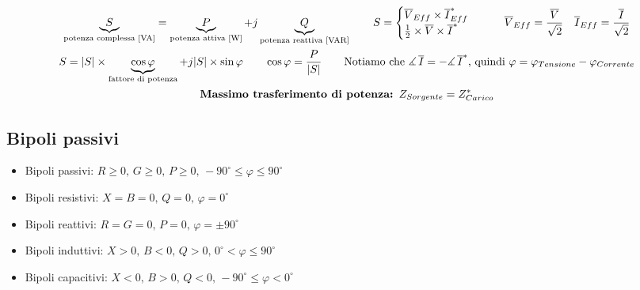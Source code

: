 \documentclass[10pt]{article}
\renewcommand{\deg}{^{\circ}}
\begin{document}
        \begin{gather*}
            \underbrace{S}_{\text{potenza complessa [VA]}} = \underbrace{P}_{\text{potenza attiva [W]}} + j \underbrace{Q}_{\text{potenza reattiva [VAR]}} \qquad
                S =
                    \begin{cases}
                        \overline{V}_{Eff} \times \overline{I}^*_{Eff}\\
                        \frac{1}{2} \times \overline{V} \times \overline{I}^*
                    \end{cases}
                \qquad \overline{V}_{Eff} = \frac{\overline{V}}{\sqrt{2}} \quad \overline{I}_{Eff} = \frac{\overline{I}}{\sqrt{2}}\\
                S = |S| \times \underbrace{\cos \varphi}_{\text{fattore di potenza}} + j |S| \times \sin \varphi \qquad \cos \varphi = \frac{P}{|S|} \qquad \text{Notiamo che } \measuredangle \, \overline{I} = - \measuredangle \, \overline{I}^* \text{, quindi } \varphi = \varphi_{Tensione} - \varphi_{Corrente}\\
                \text{\textbf{Massimo trasferimento di potenza: }} Z_{Sorgente} = Z^*_{Carico}
            \end{gather*}

    \vspace{-2\baselineskip}
    \subsection*{Bipoli passivi}
    \vspace{-1.5\baselineskip}

        \begin{multicols}{2}

            \begin{itemize}
                \item Bipoli passivi: \(R \geqslant 0,\, G \geqslant 0,\, P \geqslant 0,\, -90\deg \leqslant \varphi \leqslant 90\deg\)
                \item Bipoli resistivi: \(X=B=0,\, Q=0,\, \varphi=0\deg\)
                \item Bipoli reattivi: \(R=G=0,\, P=0,\, \varphi=\pm90\deg\)
            \end{itemize}

            \vfill\null
            \columnbreak

            \begin{itemize}
                \item Bipoli induttivi: \(X > 0,\, B<0,\, Q>0,\, 0\deg < \varphi \leqslant 90\deg\)
                \item Bipoli capacitivi: \(X<0,\, B>0,\, Q<0,\, -90\deg \leqslant \varphi < 0\deg\)
            \end{itemize}

        \end{multicols}
\end{document}
